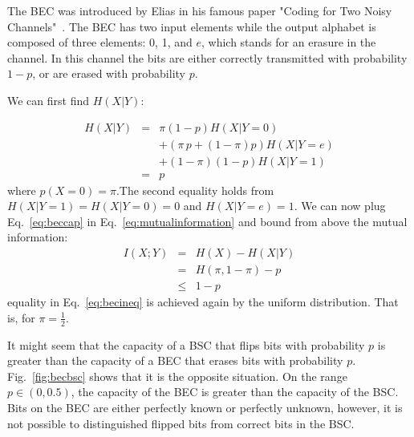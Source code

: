 The {BEC} was introduced by Elias in his famous paper "Coding for Two Noisy Channels"~\cite{Elias_55}. The {BEC} has two input elements while the output alphabet is composed of three elements: 0, 1, and $e$, which stands for an erasure in the channel. In this channel the bits are either correctly transmitted with probability $1-p$, or are erased with probability $p$. 

We can first find $H(X|Y) $: 


\begin{eqnarray}
\label{eq:beccap}
H(X|Y) &=& \pi (1-p )H(X|Y=0) \nonumber\\
           && + \left( \pi\, p +(1-\pi)p\right) H(X|Y=e)\nonumber\\
           && + (1-\pi)(1-p)H(X|Y=1) \\
           &=& p
\end{eqnarray}
\noindent where $p(X=0)=\pi$.The second equality holds from $H(X|Y=1)=H(X|Y=0)=0$ and $H(X|Y=e)=1$. We can now plug Eq.~\ref{eq:beccap} in Eq.~\ref{eq:mutualinformation} and bound from above the mutual information:
\begin{eqnarray}
I(X;Y) &=& H(X) - H(X|Y) \\
         &=& H(\pi, 1-\pi) - p\\
         & \leq & 1 - p\label{eq:becineq}
\end{eqnarray}
\noindent equality in Eq.~\ref{eq:becineq} is achieved again by the uniform distribution. That is, for $\pi=\frac{1}{2}$.

It might seem that the capacity of a {BSC} that flips bits with probability $p$ is greater than the capacity of a {BEC} that erases bits with probability $p$. Fig.~\ref{fig:becbsc} shows that it is the opposite situation. On the range $p\in\left( 0,0.5\right)$, the capacity of the {BEC} is greater than the capacity of the {BSC}. Bits on the {BEC} are either perfectly known or perfectly unknown, however, it is not possible to distinguished flipped bits from correct bits in the {BSC}.

